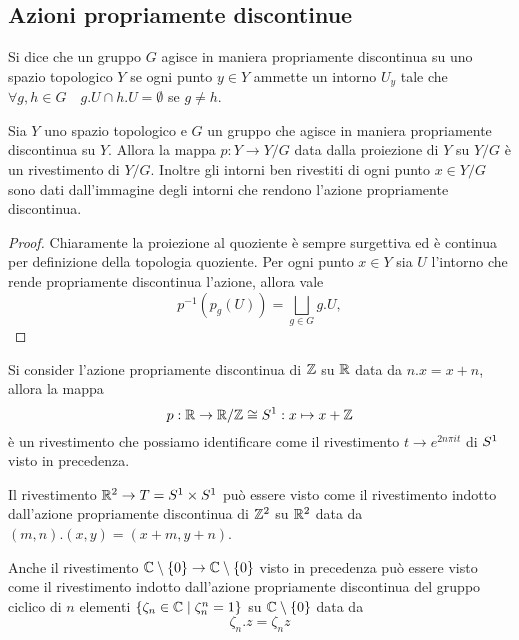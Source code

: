 \documentclass[]{article}
\begin{document}
\subsection{Azioni propriamente discontinue}

\begin{definition}  \nl
    Si dice che un gruppo $G$ agisce in maniera propriamente discontinua su uno spazio topologico $Y$ se
    ogni punto $y \in Y$ ammette un intorno $U_y$ tale che $\forall g,h \in G \quad g.U \cap h.U = \emptyset$ se $g \neq h$.
\end{definition}

\begin{proposition}  \nl
    Sia $Y$ uno spazio topologico e $G$ un gruppo che agisce in maniera propriamente discontinua su $Y$.
    Allora la mappa $p: Y \to Y/G$ data dalla proiezione di $Y$ su $Y/G$ \`e un rivestimento di $Y/G$.
    Inoltre gli intorni ben rivestiti di ogni punto $x \in Y/G$ sono dati dall'immagine degli intorni che rendono l'azione propriamente discontinua.
\end{proposition}

\begin{proof} \nl
    Chiaramente la proiezione al quoziente \`e sempre surgettiva ed \`e continua per definizione della topologia quoziente. \nl
    Per ogni punto $x \in Y$ sia $U$ l'intorno che rende propriamente discontinua l'azione, allora vale
    \[
        p^{-1}(p_g(U)) = \bigsqcup_{g \in G} g.U,
    \]
\end{proof}

\begin{example} \nl
    Si consider l'azione propriamente discontinua di $\mathbb{Z}$ su $\mathbb{R}$ data da $n . x = x + n$, allora la mappa
    \[
        p: \mathbb{R} \to \mathbb{R} / \mathbb{Z} \cong S^{1}: x \mapsto x + \mathbb{Z}
    \]
    \`e un rivestimento che possiamo identificare come il rivestimento $t \to e^{2 n \pi i t}$ di $S^{1}$ visto in precedenza.
\end{example}

\begin{example} \nl
    Il rivestimento $\mathbb{R}^2 \to T = S^{1} \times S^{1}$ pu\`o essere visto come il rivestimento indotto
    dall'azione propriamente discontinua di $\mathbb{Z}^2$ su $\mathbb{R}^2$ data da $(m, n) . (x, y) = (x + m, y + n)$.
\end{example}

\begin{example} \nl
    Anche il rivestimento $\mathbb{C} \setminus \left\{ 0 \right\} \to \mathbb{C} \setminus \left\{ 0 \right\}$ visto in precedenza pu\`o essere visto come il rivestimento indotto dall'azione propriamente discontinua
     del gruppo ciclico di $n$ elementi $\left\{ \zeta_n \in \mathbb{C} \mid \zeta_n^n =1 \right\}$ su $\mathbb{C} \setminus \left\{ 0 \right\}$ data da
     \[
        \zeta_n. z = \zeta_n z
     \]
\end{example}
\end{document}
